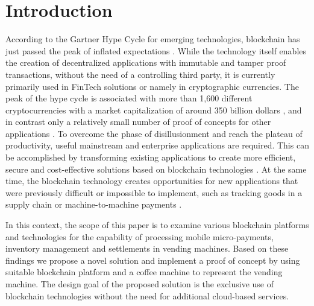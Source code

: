 \section{Introduction}
According to the Gartner Hype Cycle for emerging technologies, blockchain has just passed the peak of inflated expectations \cite{TopTrend28:online}. While the technology itself enables the creation of decentralized applications with immutable and tamper proof transactions, without the need of a controlling third party, it is currently primarily used in FinTech solutions or namely in cryptographic currencies. The peak of the hype cycle is associated with more than 1,600 different cryptocurrencies with a market capitalization of around 350 billion dollars \cite{AllCrypt83:online}, and in contrast only a relatively small number of proof of concepts for other applications \cite{8338177,8016254,8306880,DBLP:journals/corr/abs-1804-00658,PlaTIBART}. To overcome the phase of disillusionment and reach the plateau of productivity, useful mainstream and enterprise applications are required. This can be accomplished by transforming existing applications to create more efficient, secure and cost-effective solutions based on blockchain technologies \cite{REYNA2018173}. At the same time, the blockchain technology creates opportunities for new applications that were previously difficult or impossible to implement, such as tracking goods in a supply chain \cite{doi:10.1002/isaf.1424} or machine-to-machine payments \cite{8016254}.

In this context, the scope of this paper is to examine various blockchain platforms and technologies for the capability of processing mobile micro-payments, inventory management and settlements in vending machines. Based on these findings we propose a novel solution and implement a proof of concept by using suitable blockchain platform and a coffee machine to represent the vending machine. The design goal of the proposed solution is the exclusive use of blockchain technologies without the need for additional cloud-based services.